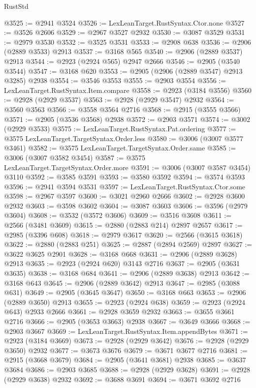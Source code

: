 \begin{lexlean}{RustStd}
\begin{coremodule}
{\begin{coremodule}
{{{{{{{{{{{{{{{{{{{{{{{{{{{{{{{{{{{{{{{{{{{{{{{{{{{{{{{{{{{{{{{{{{{{{{{{{{{{{{@3525 := @2941 @3524
@3526 := LexLeanTarget.RustSyntax.Ctor.none
@3527 := @3526 @2606
@3529 := @2967 @3527 @2932
@3530 := @3087 @3529
@3531 := @2979 @3530
@3532 := @3525 @3531
@3533 := @2908 @638
@3536 := @2906 (@2889 @3533) @2913
@3537 := @3168 @565
@3540 := @2906 (@2889 @3537) @2913
@3544 := @2923 (@2924 @565) @2947 @2666
@3546 := @2905 (@3540 @3544)
@3547 := @3168 @620
@3553 := @2905 (@2906 (@2889 @3547) @2913 @3285) @2938
@3554 := @3546 @3553
@3555 := @2903 @3554
@3556 := LexLeanTarget.RustSyntax.Item.compare
@3558 := @2923 (@3184 @3556)
@3560 := @2928 (@2929 @3537)
@3563 := @2928 (@2929 @3547) @2932
@3564 := @3560 @3563
@3566 := @3558 @3564 @2716
@3568 := @2915 (@3555 @3566)
@3571 := @2905 (@3536 @3568) @2938
@3572 := @2903 @3571
@3574 := @3002 (@2929 @3533)
@3575 := LexLeanTarget.RustSyntax.Pat.ordering
@3577 := @3575 LexLeanTarget.TargetSyntax.Order.less
@3580 := @3006 (@3007 @3577 @3461)
@3582 := @3575 LexLeanTarget.TargetSyntax.Order.same
@3585 := @3006 (@3007 @3582 @3454)
@3587 := @3575 LexLeanTarget.TargetSyntax.Order.more
@3591 := @3006 (@3007 @3587 @3454) @3110
@3592 := @3585 @3591
@3593 := @3580 @3592
@3594 := @3574 @3593
@3596 := @2941 @3594 @3531
@3597 := LexLeanTarget.RustSyntax.Ctor.some
@3598 := @2967 @3597
@3600 := @3021 @2960 @2666
@3602 := @2928 @3600 @2932
@3603 := @3598 @3602
@3604 := @3087 @3603
@3606 := @3596 (@2979 @3604)
@3608 := @3532 (@3572 @3606)
@3609 := @3516 @3608
@3611 := @2566 (@3481 @3609)
@3615 := @2880 (@2883 @214) @2897 @2657
@3617 := @2985 (@3396 @608)
@3618 := @2979 @3617
@3620 := @2566 (@3615 @3618)
@3622 := @2880 (@2883 @251)
@3625 := @2887 (@2894 @2569) @2897
@3627 := @3622 @3625 @2901
@3628 := @3168 @668
@3631 := @2906 (@2889 @3628) @2913
@3635 := @2923 (@2924 @620) @3143 @2716
@3637 := @2905 (@3631 @3635)
@3638 := @3168 @684
@3641 := @2906 (@2889 @3638) @2913
@3642 := @3168 @643
@3645 := @2906 (@2889 @3642) @2913
@3647 := @2985 (@3088 @631)
@3649 := @2905 (@3645 @3647)
@3650 := @3168 @663
@3653 := @2906 (@2889 @3650) @2913
@3655 := @2923 (@2924 @638)
@3659 := @2923 (@2924 @643) @2933 @2666
@3661 := @2928 @3659 @2932
@3663 := @3655 @3661 @2716
@3666 := @2905 (@3653 @3663) @2938
@3667 := @3649 @3666
@3668 := @2903 @3667
@3669 := LexLeanTarget.RustSyntax.Item.appendBytes
@3671 := @2923 (@3184 @3669)
@3673 := @2928 (@2929 @3642)
@3676 := @2928 (@2929 @3650) @2932
@3677 := @3673 @3676
@3679 := @3671 @3677 @2716
@3681 := @2915 (@3668 @3679)
@3684 := @2905 (@3641 @3681) @2938
@3685 := @3637 @3684
@3686 := @2903 @3685
@3688 := @2928 (@2929 @3628)
@3691 := @2928 (@2929 @3638) @2932
@3692 := @3688 @3691
@3694 := @3671 @3692 @2716
}}}}}}}}}}}}}}}}}}}}}}}}}}}}}}}}}}}}}}}}}}}}}}}}}}}}}}}}}}}}}}}}}}}}}}}}}}}}}}
\end{coremodule}}
\end{coremodule}
\end{lexlean}
